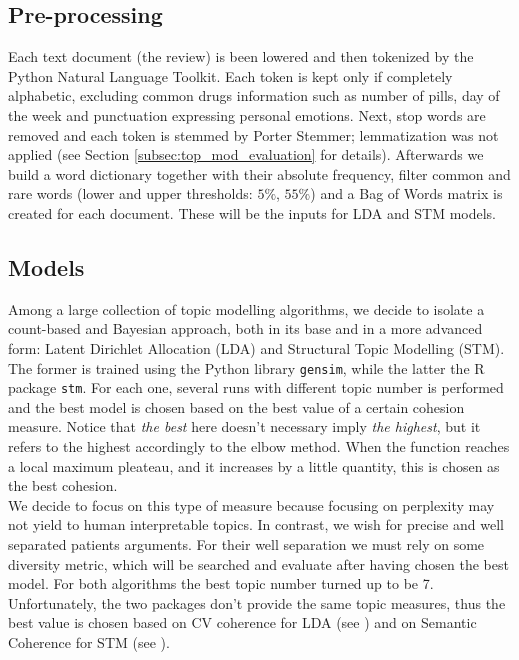 \documentclass[10pt, a4paper, twocolumn]{article}
\begin{document}
        \subsection{Pre-processing}
            Each text document (the review) is been lowered and then tokenized by the Python Natural Language Toolkit. Each token is kept only if completely alphabetic, excluding common drugs information such as number of pills, day of the week and punctuation expressing personal emotions. Next, stop words are removed and each token is stemmed by Porter Stemmer; lemmatization was not applied (see  Section \ref{subsec:top_mod_evaluation} for details). Afterwards we build a word dictionary together with their absolute frequency, filter common and rare words (lower and upper thresholds: $5\%$, $55\%$) and a Bag of Words matrix is created for each document. These will be the inputs for LDA and STM models.
            
        \subsection{Models}
            Among a large collection of topic modelling algorithms, we decide to isolate a count-based and Bayesian approach, both in its base and in a more advanced form: Latent Dirichlet Allocation (LDA) and Structural Topic Modelling (STM). The former is trained using the Python library \texttt{gensim}, while the latter the R package \texttt{stm}. For each one, several runs with different topic number is performed and the best model is chosen based on the best value of a certain cohesion measure. Notice that \emph{the best} here doesn't necessary imply \emph{the highest}, but it refers to the highest accordingly to the elbow method. When the function reaches a local maximum pleateau, and it increases by a little quantity, this is chosen as the best cohesion.\\
            We decide to focus on this type of measure because focusing on perplexity may not yield to human interpretable topics. In contrast, we wish for precise and well separated patients arguments. For their well separation we must rely on some diversity metric, which will be searched and evaluate after having chosen the best model. For both algorithms the best topic number turned up to be 7. Unfortunately, the two packages don't provide the same topic measures, thus the best value is chosen based on CV coherence for LDA (see \cite{Syed}) and on Semantic Coherence for STM (see \cite{Mimno}).\\
\end{document}
